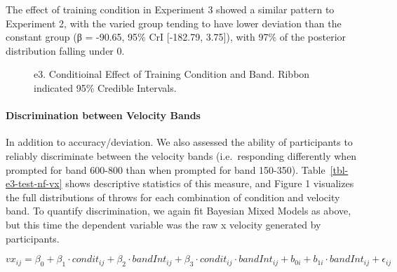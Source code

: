 \documentclass[
  letterpaper,
  DIV=11,
  numbers=noendperiod,
  oneside]{scrartcl}
\let\oldparagraph\paragraph
\renewcommand{\paragraph}[1]{\oldparagraph{#1}\mbox{}}
\begin{document}
The effect of training condition in Experiment 3 showed a similar
pattern to Experiment 2, with the varied group tending to have lower
deviation than the constant group (β = -90.65, 95\% CrI {[}-182.79,
3.75{]}), with 97\% of the posterior distribution falling under 0.

\begin{figure}


\caption{\label{fig-e3-bmm-dist}e3. Conditioinal Effect of Training
Condition and Band. Ribbon indicated 95\% Credible Intervals.}

\end{figure}%

\paragraph{Discrimination between Velocity
Bands}\label{discrimination-between-velocity-bands}

In addition to accuracy/deviation. We also assessed the ability of
participants to reliably discriminate between the velocity bands
(i.e.~responding differently when prompted for band 600-800 than when
prompted for band 150-350). Table~\ref{tbl-e3-test-nf-vx} shows
descriptive statistics of this measure, and Figure 1 visualizes the full
distributions of throws for each combination of condition and velocity
band. To quantify discrimination, we again fit Bayesian Mixed Models as
above, but this time the dependent variable was the raw x velocity
generated by participants.

\begin{equation}
vx_{ij} = \beta_0 + \beta_1 \cdot condit_{ij} + \beta_2 \cdot bandInt_{ij} + \beta_3 \cdot condit_{ij} \cdot bandInt_{ij} + b_{0i} + b_{1i} \cdot bandInt_{ij} + \epsilon_{ij}
\end{equation}
\end{document}
